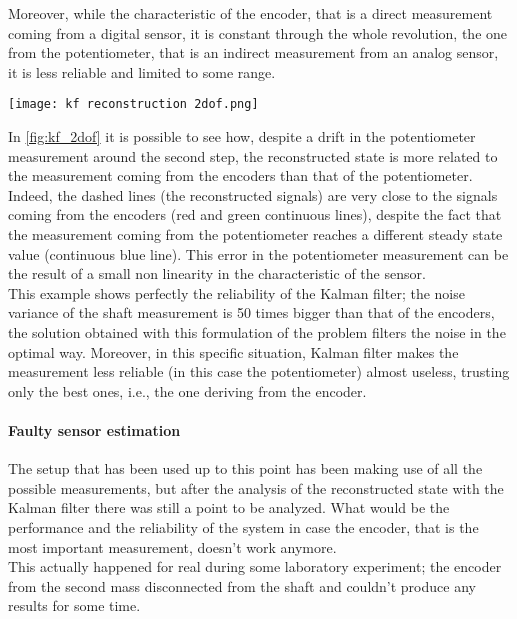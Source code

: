 Moreover, while the characteristic of the encoder, that is a direct measurement coming from a digital sensor, it is constant through the whole revolution, the one from the potentiometer, that is an indirect measurement from an analog sensor, it is less reliable and limited to some range. 
\begin{figure*}[h]
	\centering
	\texttt{[image: kf reconstruction 2dof.png]}
	\caption{Kalman filter reconstruction compared with available measurements}
	\label{fig:kf_2dof}
\end{figure*}
In \cref{fig:kf_2dof} it is possible to see how, despite a drift in the potentiometer measurement around the second step, the reconstructed state is more related to the measurement coming from the encoders than that of the potentiometer. Indeed, the dashed lines (the reconstructed signals) are very close to the signals coming from the encoders (red and green continuous lines), despite the fact that the measurement coming from the potentiometer reaches a different steady state value (continuous blue line). This error in the potentiometer measurement can be the result of a small non linearity in the characteristic of the sensor. \\

This example shows perfectly the reliability of the Kalman filter; the noise variance of the shaft measurement is 50 times bigger than that of the encoders, the solution obtained with this formulation of the problem filters the noise in the optimal way. Moreover, in this specific situation, Kalman filter makes the measurement less reliable (in this case the potentiometer) almost useless, trusting only the best ones, i.e., the one deriving from the encoder. 

\paragraph{Faulty sensor estimation}
The setup that has been used up to this point has been making use of all  the possible measurements, but after the analysis of the reconstructed state with the Kalman filter there was still a point to be analyzed. What would be the performance and the reliability of the system in case the encoder, that is the most important measurement, doesn't work anymore. \\
This actually happened for real during some laboratory experiment; the encoder from the second mass disconnected from the shaft and couldn't produce any results for some time. \\ 

